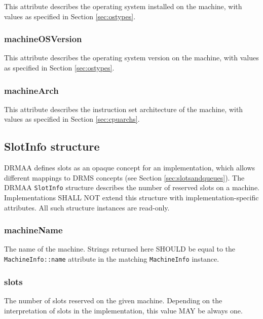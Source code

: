 \documentclass{article}
\newcommand{\h}[1]{\lstinline|#1|}
\newcommand{\rat}[1]{}
\begin{document}
This attribute describes the operating system installed on the machine, with values as specified in Section \ref{sec:ostypes}. 

\subsubsection{machineOSVersion}

This attribute describes the operating system version on the machine, with values as specified in Section \ref{sec:ostypes}. 

\subsubsection{machineArch}

This attribute describes the instruction set architecture of the machine, with values as specified in Section \ref{sec:cpuarchs}. 

\subsection{SlotInfo structure}
\label{sec:slotinfo}

DRMAA defines slots as an opaque concept for an implementation, which allows different mappings to DRMS concepts (see Section \ref{sec:slotsandqueues}). The DRMAA \h{SlotInfo} structure describes the number of reserved slots on a machine. Implementations SHALL NOT extend this structure with implementation-specific attributes. All such structure instances are read-only.

\rat{
We could see no use case in realizing implementation-specific extensions here, so this structure is not considered in DrmaaReflective. 
}



\subsubsection{machineName}

The name of the machine. Strings returned here SHOULD be equal to the  \h{MachineInfo::name} attribute in the matching \h{MachineInfo} instance.

\subsubsection{slots}

The number of slots reserved on the given machine. Depending on the interpretation of slots in the implementation, this value MAY be always one.
\end{document}
